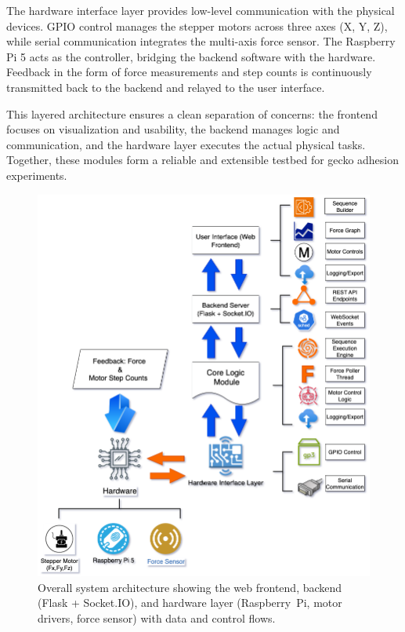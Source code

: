 \documentclass[
    twocolumn,
    fontsize = 10pt,
    parskip = half+,
    headings = small,
    headwidth = text,
    footwidth = text,
]{scrartcl}
\begin{document}
The hardware interface layer provides low-level communication with the physical devices. GPIO control manages the stepper motors across three axes (X, Y, Z), while serial communication integrates the multi-axis force sensor. The Raspberry Pi 5 acts as the controller, bridging the backend software with the hardware. Feedback in the form of force measurements and step counts is continuously transmitted back to the backend and relayed to the user interface.

This layered architecture ensures a clean separation of concerns: the frontend focuses on visualization and usability, the backend manages logic and communication, and the hardware layer executes the actual physical tasks. Together, these modules form a reliable and extensible testbed for gecko adhesion experiments. 

\begin{figure}[htbp]
  \centering
  \includegraphics[width=\linewidth]{pics/gecko_architecture.drawio.png}
  \caption{Overall system architecture showing the web frontend, backend (Flask + Socket.IO), and hardware layer (Raspberry~Pi, motor drivers, force sensor) with data and control flows.}
  \label{fig:architecture}
\end{figure}
\end{document}
